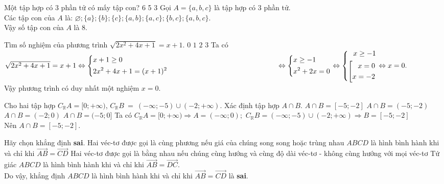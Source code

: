 \begin{ex}%
Một tập hợp có 3 phần tử có mấy tập con?
\choice
{6}
{5}
{}
{3}
\loigiai
	{Gọi $ A = \{a,b,c\} $ là tập hợp có 3 phần tử.\\
		Các tập con của $ A $ là: $ \varnothing ; \{a\}; \{b\}; \{c\}; \{a,b\}; \{a,c\}; \{b,c\}; \{a,b,c\}.$\\
		Vậy số tập con của $ A $ là 8.
	}
\end{ex}
\begin{ex}%
Tìm số nghiệm của phương trình $\sqrt{2x^2+4x+1}=x+1$.
\choice
{ $0$ }
{\True  $1$ }
{ $2$ }
{ $3$ }
	\loigiai
	{Ta có $\sqrt{2x^2+4x+1}=x+1 \Leftrightarrow \heva{&x+1 \ge 0\\& 2x^2+4x+1 = (x+1)^2 } \\	
\hspace*{5.3cm}		\Leftrightarrow \heva{&x \ge -1\\& x^2 + 2x = 0} \Leftrightarrow \heva{x\ge -1\\ \hoac{x=0\\x=-2}} \Leftrightarrow x = 0.$\\
Vậy phương trình có duy nhất một nghiệm $ x = 0. $
	}
\end{ex}
\begin{ex}%
Cho hai tập hợp $C_{\mathbb{R}}A=[0;+\infty )$, $C_{\mathbb{R}}B~=~\left(-\infty ;-5 \right)\cup \left( -2;+\infty  \right)$. Xác định tập hợp $A \cap B$.
\choice
{\True $A\cap B=[-5;-2]$}
{$A\cap B=(-5;-2)$}
{$A\cap B=(-2;0)$}
{$A\cap B=(-5;0]$}
	\loigiai
	{Ta có $C_{\mathbb{R}}A=[0;+\infty ) \Rightarrow A = (-\infty; 0);$\qquad
	$	C_{\mathbb{R}}B=\left( -\infty ;-5 \right)\cup \left( -2;+\infty  \right) \Rightarrow B = [-5;-2]$\\
	Nên $A\cap B=[-5;-2]$.
	}
\end{ex}
\begin{ex}%
Hãy chọn khẳng định \textbf{sai}.
\choice
{Hai véc-tơ được gọi là cùng phương nếu giá của chúng song song hoặc trùng nhau}
{\True  $ABCD$  là hình bình hành khi và chỉ khi  $\overrightarrow{AB}=\overrightarrow{CD}$}
{Hai véc-tơ được gọi là bằng nhau nếu chúng cùng hướng và cùng độ dài}
{véc-tơ - không cùng hướng với mọi véc-tơ}
	\loigiai
	{Tứ giác $ABCD$  là hình bình hành khi và chỉ khi  $\overrightarrow{AB}=\overrightarrow{DC}$.\\
		Do vậy, khẳng định $ABCD$  là hình bình hành khi và chỉ khi  $\overrightarrow{AB}=\overrightarrow{CD}$ là \textbf{sai}. 
	}
\end{ex}
